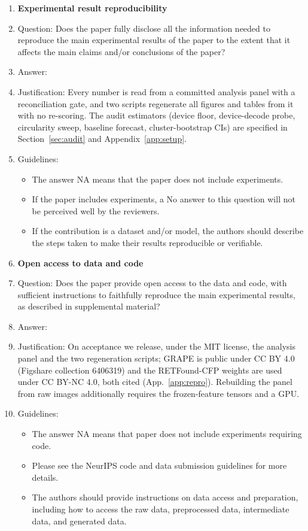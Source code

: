 \begin{enumerate}
\item {\bf Experimental result reproducibility}
    \item[] Question: Does the paper fully disclose all the information needed to reproduce the main experimental results of the paper to the extent that it affects the main claims and/or conclusions of the paper?
    \item[] Answer: \answerYes{}
    \item[] Justification: Every number is read from a committed analysis panel with a reconciliation gate, and two scripts regenerate all figures and tables from it with no re-scoring. The audit estimators (device floor, device-decode probe, circularity sweep, baseline forecast, cluster-bootstrap CIs) are specified in Section~\ref{sec:audit} and Appendix~\ref{app:setup}.
    \item[] Guidelines:
    \begin{itemize}
        \item The answer NA means that the paper does not include experiments.
        \item If the paper includes experiments, a No answer to this question will not be perceived well by the reviewers.
        \item If the contribution is a dataset and/or model, the authors should describe the steps taken to make their results reproducible or verifiable.
    \end{itemize}

\item {\bf Open access to data and code}
    \item[] Question: Does the paper provide open access to the data and code, with sufficient instructions to faithfully reproduce the main experimental results, as described in supplemental material?
    \item[] Answer: \answerYes{}
    \item[] Justification: On acceptance we release, under the MIT license, the analysis panel and the two regeneration scripts; GRAPE is public under CC BY 4.0 (Figshare collection 6406319) and the RETFound-CFP weights are used under CC BY-NC 4.0, both cited (App.~\ref{app:repro}). Rebuilding the panel from raw images additionally requires the frozen-feature tensors and a GPU.
    \item[] Guidelines:
    \begin{itemize}
        \item The answer NA means that paper does not include experiments requiring code.
        \item Please see the NeurIPS code and data submission guidelines for more details.
        \item The authors should provide instructions on data access and preparation, including how to access the raw data, preprocessed data, intermediate data, and generated data.
    \end{itemize}


\end{enumerate}
